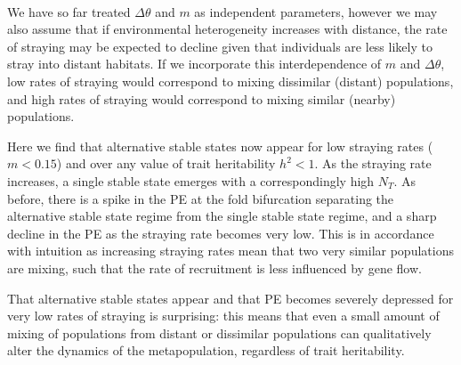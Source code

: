 \documentclass[twocolumn,preprintnumbers,amsmath,amssymb,superscriptaddress]{revtex4}
\begin{document}

\\ 
\noindent We have so far treated $\Delta\theta$ and $m$ as independent parameters, however we may also assume that if environmental heterogeneity increases with distance, the rate of straying may be expected to decline given that individuals are less likely to stray into distant habitats. %
If we incorporate this interdependence of $m$ and $\Delta\theta$, low rates of straying would correspond to mixing dissimilar (distant) populations, and high rates of straying would correspond to mixing similar (nearby) populations.

Here we find that alternative stable states now appear for low straying rates ($m<0.15$) and over any value of trait heritability $h^2<1$.
As the straying rate increases, a single stable state emerges with a correspondingly high $N_T$.
As before, there is a spike in the PE at the fold bifurcation separating the alternative stable state regime from the single stable state regime, and a sharp decline in the PE as the straying rate becomes very low.
This is in accordance with intuition as increasing straying rates mean that two very similar populations are mixing, such that the rate of recruitment is less influenced by gene flow.

That alternative stable states appear and that PE becomes severely depressed for very low rates of straying is surprising: this means that even a small amount of mixing of populations from distant or dissimilar populations can qualitatively alter the dynamics of the metapopulation, regardless of trait heritability.
\end{document}
